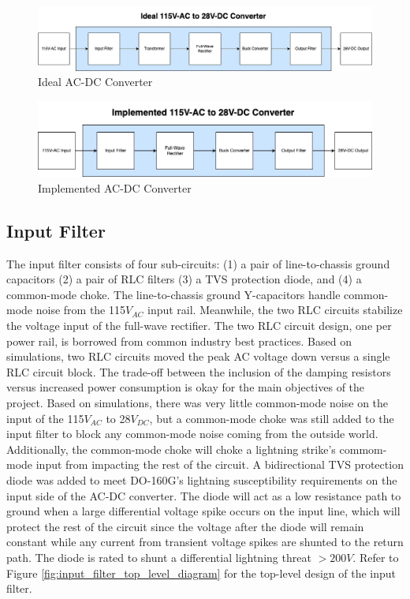 \documentclass[conference]{IEEEtran}
\begin{document}
\begin{figure}[htbp]
    \centering
    \includegraphics[width=1.0\linewidth]{ac_dc_converter_ideal.png}
    \caption{Ideal AC-DC Converter}
    \label{fig:ac_dc_converter_ideal_diagram}
\end{figure}

\begin{figure}[h]
    \centering
    \includegraphics[width=1.0\linewidth]{ac_dc_converter_implemented.png}
    \caption{Implemented AC-DC Converter}
    \label{fig:ac_dc_converter_implemented_diagram}
\end{figure}

\FloatBarrier

\subsection{Input Filter}

The input filter consists of four sub-circuits: (1) a pair of line-to-chassis ground capacitors (2) a pair of RLC filters (3) a TVS protection diode, and (4) a common-mode choke. The line-to-chassis ground Y-capacitors handle common-mode noise from the 115$V_{AC}$ input rail. Meanwhile, the two RLC circuits stabilize the voltage input of the full-wave rectifier. The two RLC circuit design, one per power rail, is borrowed from common industry best practices. Based on simulations, two RLC circuits moved the peak AC voltage down versus a single RLC circuit block. The trade-off between the inclusion of the damping resistors versus increased power consumption is okay for the main objectives of the project. Based on simulations, there was very little common-mode noise on the input of the 115$V_{AC}$ to 28$V_{DC}$, but a common-mode choke was still added to the input filter to block any common-mode noise coming from the outside world. Additionally, the common-mode choke will choke a lightning strike's commom-mode  input from impacting the rest of the circuit. A bidirectional TVS protection diode was added to meet DO-160G's lightning susceptibility requirements on the input side of the AC-DC converter. The diode will act as a low resistance path to ground when a large differential voltage spike occurs on the input line, which will protect the rest of the circuit since the voltage after the diode will remain constant while any current from transient voltage spikes are shunted to the return path. The diode is rated to shunt a differential lightning threat $>200V$. Refer to Figure \ref{fig:input_filter_top_level_diagram} for the top-level design of the input filter. 
\end{document}
